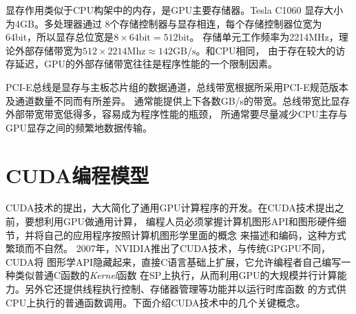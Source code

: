 显存作用类似于CPU构架中的内存，是GPU主要存储器。Tesla C1060 显存大小为4GB。多处理器通过
8个存储控制器与显存相连，每个存储控制器位宽为64bit，所以显存总位宽是$8\times 64\text{bit}=512\text{bit}$。
存储单元工作频率为2214MHz，理论外部存储带宽为$512\times 2214\text{Mhz}\approx142\text{GB/s}$。和CPU相同，
由于存在较大的访存延迟，GPU的外部存储带宽往往是程序性能的一个限制因素。

PCI-E总线是显存与主板芯片组的数据通道，总线带宽根据所采用PCI-E规范版本及通道数量不同而有所差异。
通常能提供上下各数GB/s的带宽。总线带宽比显存外部带宽带宽低得多，容易成为程序性能的瓶颈，
所通常要尽量减少CPU主存与GPU显存之间的频繁地数据传输。

\section{CUDA编程模型}
CUDA技术的提出，大大简化了通用GPU计算程序的开发。在CUDA技术提出之前，要想利用GPU做通用计算，
编程人员必须掌握计算机图形API和图形硬件细节，并将自己的应用程序按照计算机图形学里面的概念
来描述和编码，这种方式繁琐而不自然。 2007年，NVIDIA推出了CUDA技术，与传统GPGPU不同，CUDA将
图形学API隐藏起来，直接C语言基础上扩展，它允许编程者自己编写一种类似普通C函数的\textit{Kernel}函数
在SP上执行，从而利用GPU的大规模并行计算能力。另外它还提供线程执行控制、存储器管理等功能并以运行时库函数
的方式供CPU上执行的普通函数调用。下面介绍CUDA技术中的几个关键概念。
